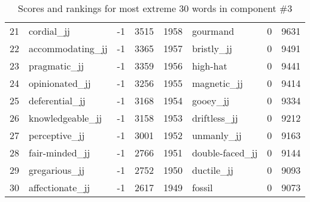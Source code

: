 \begin{table}[tbp]
\begin{tabular}{| rlr@{.}l | rlr@{.}l |}
    21 & cordial\_jj & -1 & 3515    &    1958 & gourmand & 0 & 9631 \\
    22 & accommodating\_jj & -1 & 3365    &    1957 & bristly\_jj & 0 & 9491 \\
    23 & pragmatic\_jj & -1 & 3359    &    1956 & high-hat & 0 & 9441 \\
    24 & opinionated\_jj & -1 & 3256    &    1955 & magnetic\_jj & 0 & 9414 \\
    25 & deferential\_jj & -1 & 3168    &    1954 & gooey\_jj & 0 & 9334 \\
    26 & knowledgeable\_jj & -1 & 3158    &    1953 & driftless\_jj & 0 & 9212 \\
    27 & perceptive\_jj & -1 & 3001    &    1952 & unmanly\_jj & 0 & 9163 \\
    28 & fair-minded\_jj & -1 & 2766    &    1951 & double-faced\_jj & 0 & 9144 \\
    29 & gregarious\_jj & -1 & 2752    &    1950 & ductile\_jj & 0 & 9093 \\
    30 & affectionate\_jj & -1 & 2617    &    1949 & fossil & 0 & 9073 \\
    \hline
    \end{tabular}
    \caption{Scores and rankings for most extreme 30 words in component \#3} 
\end{table}
\clearpage
